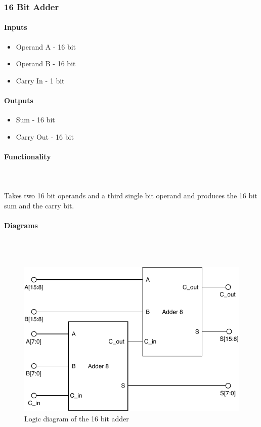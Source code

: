 \documentclass{article}
\begin{document}
    



       \subsubsection{16 Bit Adder}

       \paragraph{Inputs}
       \begin{itemize}
           \item Operand A - 16 bit
           \item Operand B - 16 bit
           \item Carry In - 1 bit
       \end{itemize}
   
       \paragraph{Outputs}
       \begin{itemize}
           \item Sum - 16 bit
           \item Carry Out - 16 bit
       \end{itemize}
   
       \paragraph{Functionality}
       \hfill\\\\
       Takes two 16 bit operands and a third single bit operand and produces the
       16 bit sum and the carry bit.
   
       \paragraph{Diagrams}
       \hfill\\\\
       \begin{figure}[H]
           \centering
           \includegraphics{../diagrams/alu/adder/adder_16.pdf}
           \caption{Logic diagram of the 16 bit adder}
       \end{figure}
   
\end{document}
